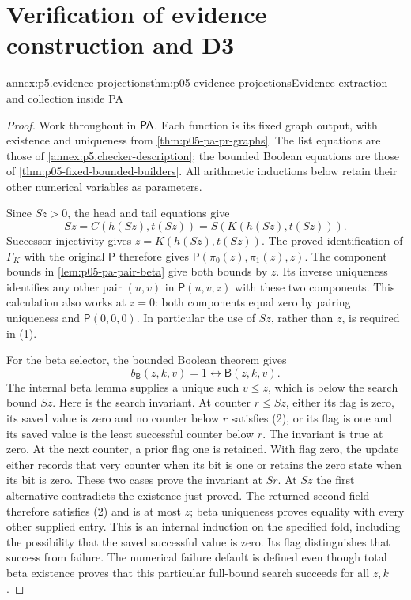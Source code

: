 \section{Verification of evidence construction and D3}
\label{sec:annex-p05-pa-positive-introspection}

\begin{annexitem}{annex:p5.evidence-projections}{thm:p05-evidence-projections}{Evidence extraction and collection inside PA}
\begin{proof}
Work throughout in \(\mathsf{PA}\). Each function is its fixed graph output,
with existence and uniqueness from \cref{thm:p05-pa-pr-graphs}.
The list equations are those of \cref{annex:p5.checker-description};
the bounded Boolean equations are those of
\cref{thm:p05-fixed-bounded-builders}. All arithmetic inductions below
retain their other numerical variables as parameters.

Since \(Sz>0\), the head and tail equations give
\[
             Sz=C(h(Sz),t(Sz))=S(K(h(Sz),t(Sz))).
\tag{1}
\]
Successor injectivity gives \(z=K(h(Sz),t(Sz))\). The proved
identification of \(\Gamma_K\) with the original \(\mathsf P\)
therefore gives \(\mathsf P(\pi_0(z),\pi_1(z),z)\). The component
bounds in \cref{lem:p05-pa-pair-beta} give both bounds by \(z\).
Its inverse uniqueness identifies any other pair \((u,v)\) in
\(\mathsf P(u,v,z)\) with these two components. This calculation
also works at \(z=0\): both components equal zero by pairing
uniqueness and \(\mathsf P(0,0,0)\). In particular the use of
\(Sz\), rather than \(z\), is required in (1).

For the beta selector, the bounded Boolean theorem gives
\[
          b_{\mathsf B}(z,k,v)=1\leftrightarrow\mathsf B(z,k,v).
\tag{2}
\]
The internal beta lemma supplies a unique such \(v\leq z\), which
is below the search bound \(Sz\). Here is the search invariant. At
counter \(r\leq Sz\), either its flag is zero, its saved value is
zero and no counter below \(r\) satisfies (2), or its flag is one
and its saved value is the least successful counter below \(r\).
The invariant is true at zero. At the next counter, a prior flag one
is retained. With flag zero, the update either records that very counter
when its bit is one or retains the zero state when its bit is zero.
These two cases prove the invariant at \(Sr\). At \(Sz\) the first
alternative contradicts the existence just proved. The returned second
field therefore satisfies (2) and is at most \(z\); beta uniqueness
proves equality with every other supplied entry. This is an internal
induction on the specified fold, including the possibility that the saved
successful value is zero. Its flag distinguishes that success from failure.
The numerical failure default is defined even though total beta existence
proves that this particular full-bound search succeeds for all \(z,k\).


\end{proof}
\end{annexitem}
